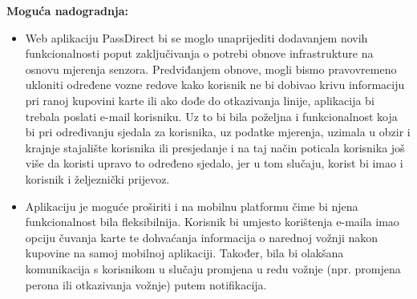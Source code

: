 \textbf{Moguća nadogradnja:}\\
\begin{itemize}
    \item Web aplikaciju PassDirect bi se moglo unaprijediti dodavanjem novih funkcionalnosti poput zaključivanja o potrebi obnove infrastrukture na osnovu mjerenja senzora. Predviđanjem obnove, mogli bismo pravovremeno ukloniti određene vozne redove kako korisnik ne bi dobivao krivu informaciju pri ranoj kupovini karte ili ako dođe do otkazivanja linije, aplikacija bi trebala poslati e-mail korisniku.
    Uz to bi bila poželjna i funkcionalnost koja bi pri određivanju sjedala za korisnika, uz podatke mjerenja, uzimala u obzir i krajnje stajalište korisnika ili presjedanje i na taj način poticala korisnika još više da koristi upravo to određeno sjedalo, jer u tom slučaju, korist bi imao i korisnik i željeznički prijevoz. 
    \item Aplikaciju je moguće proširiti i na mobilnu platformu čime bi njena funkcionalnost bila fleksibilnija. Korisnik bi umjesto korištenja e-maila imao opciju čuvanja karte te dohvaćanja informacija o narednoj vožnji nakon kupovine na samoj mobilnoj aplikaciji. Također, bila bi olakšana komunikacija s korisnikom u slučaju promjena u redu vožnje (npr. promjena perona ili otkazivanja vožnje) putem notifikacija.
\end{itemize}



